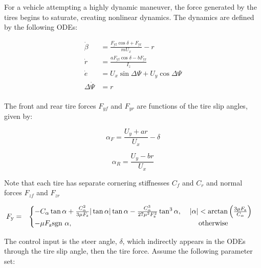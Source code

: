 \documentclass[11pt]{article}
\begin{document}
For a vehicle attempting a highly dynamic maneuver, the force generated by the tires begins to saturate, creating nonlinear dynamics. The dynamics are defined by the following ODEs:

\begin{subequations}
\label{eq:bm}
\begin{align}
	\dot{\beta} &= \frac{F_\mathrm{yf}\cos{\delta}+F_\mathrm{yr}}{mU_x} - r \label{eq:bm1}\\
	\dot{r} &= \frac{aF_\mathrm{yf}\cos{\delta} - bF_\mathrm{yr}}{I_z} \label{eq:bm2} \\
	\dot{e} &= U_x\sin{\Delta\Psi} + U_y\cos{\Delta\Psi} \label{eq:bm3} \\
	\Delta\dot{\Psi} &= r \label{eq:bm4} \\
\end{align}
\end{subequations}

The front and rear tire forces $F_{yf}$ and $F_{yr}$ are functions of the tire slip angles, given by:

\begin{equation}
\alpha_F = \frac{ U_y + ar }{U_x} - \delta
\end{equation}

\begin{equation}
\alpha_R = \frac{U_y - br}{U_x}
\end{equation}

Note that each tire has separate cornering stiffnesses $C_f$ and $C_r$ and normal forces $F_{zf}$ and $F_{zr}$

\begin{eqnarray}
\label{eqn:fiala}
	F_\mathrm{y}&=&\begin{cases} -C_{\alpha}\tan\alpha + \frac{C_{\alpha}^2}{3\mu F_\mathrm{z}} |\tan\alpha| \tan\alpha - \frac{C_{\alpha}^3}{27\mu^2F_\mathrm{z}^2}\tan^3\alpha,
\hspace{4mm}  |\alpha| < \arctan{\left(\frac{3\mu F_\mathrm{z}}{C_\alpha}\right)} \\ -\mu F_\mathrm{z}\text{sgn} \ \alpha, \hspace{62mm} \mathrm{otherwise} \end{cases}
\end{eqnarray}

The control input is the steer angle, $\delta$, which indirectly appears in the ODEs through the tire slip angle, then the tire force. Assume the following parameter set:
\newpage
\end{document}

